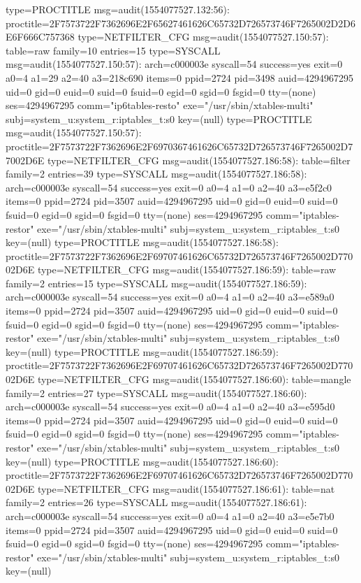 \documentclass[]{report}
\newenvironment{Shaded}{}{}
\newcommand{\NormalTok}[1]{#1}
\begin{document}
\begin{Shaded}
\begin{Highlighting}[]
\NormalTok{type=PROCTITLE msg=audit(1554077527.132:56): proctitle=2F7573722F7362696E2F65627461626C65732D726573746F7265002D2D6E6F666C757368}
\NormalTok{type=NETFILTER_CFG msg=audit(1554077527.150:57): table=raw family=10 entries=15}
\NormalTok{type=SYSCALL msg=audit(1554077527.150:57): arch=c000003e syscall=54 success=yes exit=0 a0=4 a1=29 a2=40 a3=218c690 items=0 ppid=2724 pid=3498 auid=4294967295 uid=0 gid=0 euid=0 suid=0 fsuid=0 egid=0 sgid=0 fsgid=0 tty=(none) ses=4294967295 comm="ip6tables-resto" exe="/usr/sbin/xtables-multi" subj=system_u:system_r:iptables_t:s0 key=(null)}
\NormalTok{type=PROCTITLE msg=audit(1554077527.150:57): proctitle=2F7573722F7362696E2F6970367461626C65732D726573746F7265002D77002D6E}
\NormalTok{type=NETFILTER_CFG msg=audit(1554077527.186:58): table=filter family=2 entries=39}
\NormalTok{type=SYSCALL msg=audit(1554077527.186:58): arch=c000003e syscall=54 success=yes exit=0 a0=4 a1=0 a2=40 a3=e5f2c0 items=0 ppid=2724 pid=3507 auid=4294967295 uid=0 gid=0 euid=0 suid=0 fsuid=0 egid=0 sgid=0 fsgid=0 tty=(none) ses=4294967295 comm="iptables-restor" exe="/usr/sbin/xtables-multi" subj=system_u:system_r:iptables_t:s0 key=(null)}
\NormalTok{type=PROCTITLE msg=audit(1554077527.186:58): proctitle=2F7573722F7362696E2F69707461626C65732D726573746F7265002D77002D6E}
\NormalTok{type=NETFILTER_CFG msg=audit(1554077527.186:59): table=raw family=2 entries=15}
\NormalTok{type=SYSCALL msg=audit(1554077527.186:59): arch=c000003e syscall=54 success=yes exit=0 a0=4 a1=0 a2=40 a3=e589a0 items=0 ppid=2724 pid=3507 auid=4294967295 uid=0 gid=0 euid=0 suid=0 fsuid=0 egid=0 sgid=0 fsgid=0 tty=(none) ses=4294967295 comm="iptables-restor" exe="/usr/sbin/xtables-multi" subj=system_u:system_r:iptables_t:s0 key=(null)}
\NormalTok{type=PROCTITLE msg=audit(1554077527.186:59): proctitle=2F7573722F7362696E2F69707461626C65732D726573746F7265002D77002D6E}
\NormalTok{type=NETFILTER_CFG msg=audit(1554077527.186:60): table=mangle family=2 entries=27}
\NormalTok{type=SYSCALL msg=audit(1554077527.186:60): arch=c000003e syscall=54 success=yes exit=0 a0=4 a1=0 a2=40 a3=e595d0 items=0 ppid=2724 pid=3507 auid=4294967295 uid=0 gid=0 euid=0 suid=0 fsuid=0 egid=0 sgid=0 fsgid=0 tty=(none) ses=4294967295 comm="iptables-restor" exe="/usr/sbin/xtables-multi" subj=system_u:system_r:iptables_t:s0 key=(null)}
\NormalTok{type=PROCTITLE msg=audit(1554077527.186:60): proctitle=2F7573722F7362696E2F69707461626C65732D726573746F7265002D77002D6E}
\NormalTok{type=NETFILTER_CFG msg=audit(1554077527.186:61): table=nat family=2 entries=26}
\NormalTok{type=SYSCALL msg=audit(1554077527.186:61): arch=c000003e syscall=54 success=yes exit=0 a0=4 a1=0 a2=40 a3=e5e7b0 items=0 ppid=2724 pid=3507 auid=4294967295 uid=0 gid=0 euid=0 suid=0 fsuid=0 egid=0 sgid=0 fsgid=0 tty=(none) ses=4294967295 comm="iptables-restor" exe="/usr/sbin/xtables-multi" subj=system_u:system_r:iptables_t:s0 key=(null)}

\end{Highlighting}
\end{Shaded}
\end{document}
